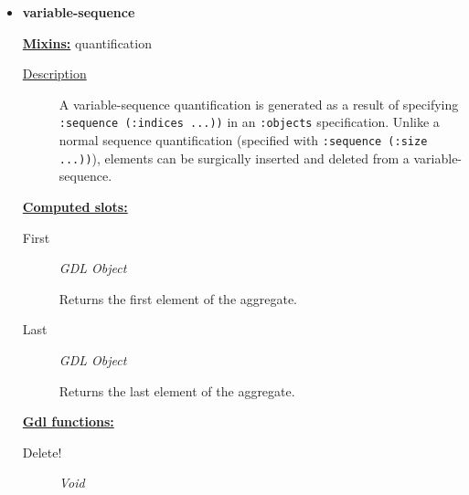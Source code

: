 \documentclass [11pt]{book}
\begin{document}
\begin{itemize}
\begin{description}
\end{description}







\item {}
\label{prim:variable-sequence}
\textbf{variable-sequence}


\textbf{
\underline{Mixins:}} quantification





\begin{description}

\item [
\underline{Description}]


A variable-sequence quantification is generated as a result of specifying 
\texttt{:sequence (:indices ...))} in an \texttt{:objects} specification. Unlike a normal sequence quantification (specified
with \texttt{:sequence (:size ...))}), elements can be surgically inserted and deleted from a variable-sequence.



\end{description}








\textbf{
\underline{Computed slots:}}

\begin{description}

\item [First]
\emph{GDL Object}

 Returns the first element of the aggregate.




\item [Last]
\emph{GDL Object}

 Returns the last element of the aggregate.




\end{description}






\textbf{
\underline{Gdl functions:}}

\begin{description}

\item [Delete!]
\emph{Void}


\end{description}
\end{itemize}
\end{document}
